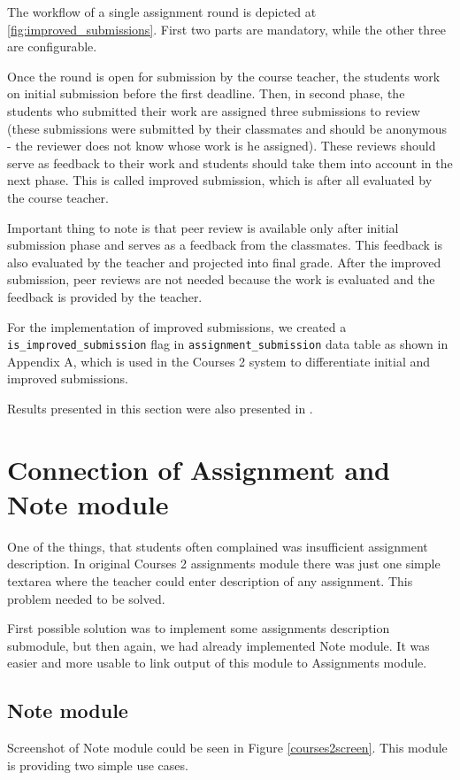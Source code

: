 The workflow of a single assignment round is depicted at \ref{fig:improved_submissions}. First two parts are mandatory, while the other three are configurable.


Once the round is open for submission by the course teacher, the students work on initial submission before the first deadline. Then, in second phase, the students who submitted their work are assigned three submissions to review (these submissions were submitted by their classmates and should be anonymous - the reviewer does not know whose work is he assigned). These reviews should serve as feedback to their work and students should take them into account in the next phase. This is called improved submission, which is after all evaluated by the course teacher.

Important thing to note is that peer review is available only after initial submission phase and serves as a feedback from the classmates. This feedback is also evaluated by the teacher and projected into final grade. After the improved submission, peer reviews are not needed because the work is evaluated and the feedback is provided by the teacher.

For the implementation of improved submissions, we created a \texttt{is\_improved\_submission} flag in 
\texttt{assignment\_submission} data table as shown in Appendix A, which is used in the Courses 2 system to differentiate initial and improved submissions.

Results presented in this section were also presented in \cite{peerreview}.

\section{Connection of Assignment and Note module}

One of the things, that students often complained was insufficient assignment description. In original Courses 2 assignments module there was just one simple textarea where the teacher could enter description of any assignment. This problem needed to be solved.

First possible solution was to implement some assignments description submodule, but then again, we had already implemented Note module. It was easier and more usable to link output of this module to Assignments module.

\subsection{Note module}
Screenshot of Note module could be seen in Figure \ref{courses2screen}. This module is providing two simple use cases.


